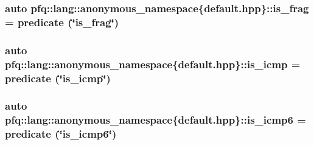 \hypertarget{namespacepfq_1_1lang_1_1anonymous__namespace_02default_8hpp_03_af042e092c925ae6306ae85ae5a56563d}{
\subsubsection[{is\+\_\+frag}]{\setlength{\rightskip}{0pt plus 5cm}auto pfq\+::lang\+::anonymous\+\_\+namespace\{default.\+hpp\}\+::is\+\_\+frag = {\bf predicate} (\char`\"{}is\+\_\+frag\char`\"{})}}\label{namespacepfq_1_1lang_1_1anonymous__namespace_02default_8hpp_03_af042e092c925ae6306ae85ae5a56563d}
\hypertarget{namespacepfq_1_1lang_1_1anonymous__namespace_02default_8hpp_03_a01ccba89c8582ba423393226b54f12de}{
\subsubsection[{is\+\_\+icmp}]{\setlength{\rightskip}{0pt plus 5cm}auto pfq\+::lang\+::anonymous\+\_\+namespace\{default.\+hpp\}\+::is\+\_\+icmp = {\bf predicate} (\char`\"{}is\+\_\+icmp\char`\"{})}}\label{namespacepfq_1_1lang_1_1anonymous__namespace_02default_8hpp_03_a01ccba89c8582ba423393226b54f12de}
\hypertarget{namespacepfq_1_1lang_1_1anonymous__namespace_02default_8hpp_03_a01d6e9764945cc33a11f3ce6a9925549}{
\subsubsection[{is\+\_\+icmp6}]{\setlength{\rightskip}{0pt plus 5cm}auto pfq\+::lang\+::anonymous\+\_\+namespace\{default.\+hpp\}\+::is\+\_\+icmp6 = {\bf predicate} (\char`\"{}is\+\_\+icmp6\char`\"{})}}\label{namespacepfq_1_1lang_1_1anonymous__namespace_02default_8hpp_03_a01d6e9764945cc33a11f3ce6a9925549}
